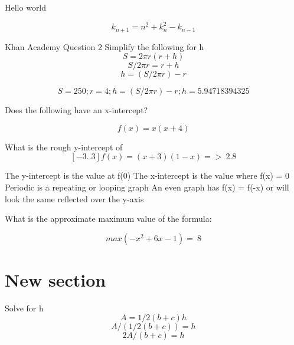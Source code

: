 \documentclass{article}
\begin{document}
Hello world


\begin{equation}
k_{n+1} = n^2 + k_n^2 - k_{n-1}
\end{equation}

Khan Academy Question 2
Simplify the following for h
\begin{equation}
S=2\pi r(r+h)
\end{equation}
\begin{equation}
S/2\pi r=r+h
\end{equation}
\begin{equation}
h=(S/2\pi r)-r
\end{equation}

\begin{equation}
  S=250;
  r=4;
  h=(S/2\pi r)-r;
  h= 5.94718394325
\end{equation}


Does the following have an x-intercept?

\begin{equation}
  f(x) = x(x+4)
\end{equation}


What is the rough y-intercept of $$[-3..3] f(x) = (x+3)(1-x) => ~2.8$$

The y-intercept is the value at f(0)
The x-intercept is the value where f(x) = 0
Periodic is a repeating or looping graph
An even graph has f(x) = f(-x) or will look the same reflected over the y-axis

What is the approximate maximum value of the formula:

\begin{equation}
  max(-x^2 + 6x - 1)  = ~8
\end{equation}


\section{New section}
Solve for h
\begin{equation}
  A= 1/​2 ​​ (b+c)h
\end{equation}
\begin{equation}
  A/(1/2(b+c))= h
\end{equation}
\begin{equation}
  2A/(b+c)= h
\end{equation}
\end{document}
